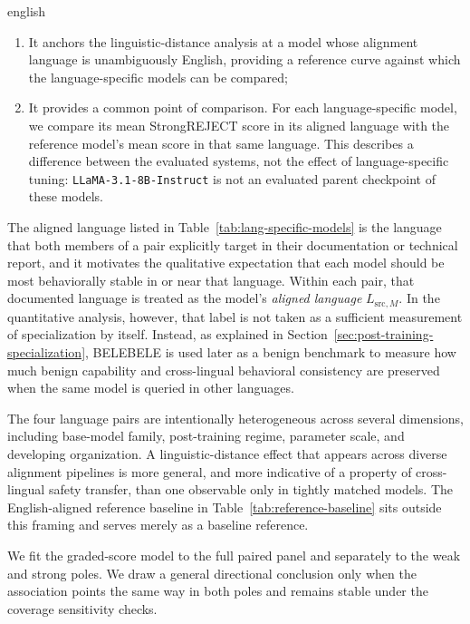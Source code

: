 \begin{otherlanguage*}{english}
\begin{enumerate}[label=(\roman*)]
    \item It anchors the linguistic-distance analysis at a model whose alignment language is unambiguously English, providing a reference curve against which the language-specific models can be compared;

	\item It provides a common point of comparison. For each language-specific model, we compare its mean StrongREJECT score in its aligned language with the reference model's mean score in that same language. This describes a difference between the evaluated systems, not the effect of language-specific tuning: \texttt{LLaMA-3.1-8B-Instruct} is not an evaluated parent checkpoint of these models.
\end{enumerate}

The aligned language listed in Table~\ref{tab:lang-specific-models} is the language that both members of a pair explicitly target in their documentation or technical report, and it motivates the qualitative expectation that each model should be most behaviorally stable in or near that language. Within each pair, that documented language is treated as the model's \emph{aligned language} $L_{\mathrm{src},M}$. In the quantitative analysis, however, that label is not taken as a sufficient measurement of specialization by itself. Instead, as explained in Section~\ref{sec:post-training-specialization}, BELEBELE is used later as a benign benchmark to measure how much benign capability and cross-lingual behavioral consistency are preserved when the same model is queried in other languages.

The four language pairs are intentionally heterogeneous across several dimensions, including base-model family, post-training regime, parameter scale, and developing organization. A linguistic-distance effect that appears across diverse alignment pipelines is more general, and more indicative of a property of cross-lingual safety transfer, than one observable only in tightly matched models. The English-aligned reference baseline in Table~\ref{tab:reference-baseline} sits outside this framing and serves merely as a baseline reference.

We fit the graded-score model to the full paired panel and separately to the weak and strong poles. We draw a general directional conclusion only when the association points the same way in both poles and remains stable under the coverage sensitivity checks.


\end{otherlanguage*}
